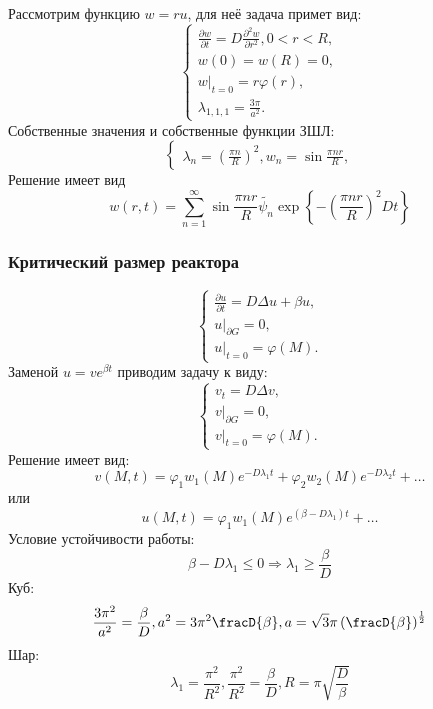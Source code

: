 \documentclass[11pt]{article}
\begin{document}
Рассмотрим функцию $w = ru$, для неё задача примет вид:
\begin{equation}
\begin{cases}
\frac{\partial w}{\partial t} = D\frac{\partial^2 w}{\partial r^2}, 0 < r < R, \\
w(0) = w(R) = 0, \\
w|_{t = 0} = r\varphi(r) , \\
\lambda_{1, 1, 1} = \frac{3\pi}{a^2}.
\end{cases}
\end{equation}
Собственные значения и собственные функции ЗШЛ:
\begin{equation}
\begin{cases}
\lambda_n = \left(\frac{\pi n}R\right)^2, w_n = \sin\frac{\pi nr}R,
\end{cases}
\end{equation}
Решение имеет вид
\begin{equation}
w(r, t) = \sum_{n = 1}^{\infty}\sin\frac{\pi nr}R\tilde{\psi_n}\exp\left\{-\left(\frac{\pi nr}R\right)^2Dt\right\}
\end{equation}
\subsubsection{Критический размер реактора}
\label{sec:org9216d25}
\begin{equation}
\begin{cases}
\frac{\partial u}{\partial t} = D\Delta u + \beta u, \\
u|_{\partial G} = 0, \\
u|_{t = 0} = \varphi(M).
\end{cases}
\end{equation}
Заменой $u = ve^{\beta t}$ приводим задачу к виду:
\begin{equation}
\begin{cases}
v_t = D\Delta v, \\
v|_{\partial G} = 0, \\
v|_{t = 0} = \varphi(M).
\end{cases}
\end{equation}
Решение имеет вид:
\begin{equation}
v(M, t) = \varphi_1w_1(M)e^{-D\lambda_1t} + \varphi_2w_2(M)e^{-D\lambda_2t} + \ldots
\end{equation}
или
\begin{equation}
u(M, t) = \varphi_1w_1(M)e^{(\beta - D\lambda_1)t} + \ldots
\end{equation}
Условие устойчивости работы:
\begin{equation}
\beta - D\lambda_1 \leq 0 \Rightarrow \lambda_1 \geq \frac{\beta}D
\end{equation}
Куб:
\begin{equation}
\frac{3\pi^2}{a^2} = \frac{\beta}D, a^2 = 3\pi^2\fracD{\beta}, a = \sqrt{3}\pi\left(\fracD{\beta}\right)^\frac12
\end{equation}
Шар:
\begin{equation}
\lambda_1 = \frac{\pi^2}{R^2}, \frac{\pi^2}{R^2} = \frac{\beta}D, R = \pi\sqrt{\frac{D}{\beta}}
\end{equation}
\end{document}

